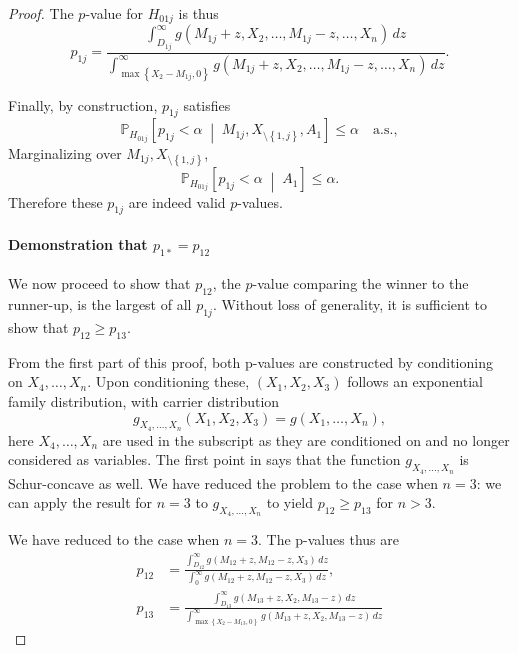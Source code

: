 \documentclass[11pt]{article}
\theoremstyle{definition}
\theoremstyle{custom}
\newcommand{\PP}{\mathbb{P}}
\begin{document}
\begin{proof}
The $p$-value for $H_{01j}$ is thus
\begin{equation}
p_{1j} = \frac{\int_{D_{1j}}^\infty g\left(M_{1j} + z, X_2, \ldots, M_{1j} - z, \ldots, X_n\right) \,dz}{\int_{\max\left\{X_2 - M_{1j}, 0\right\}}^\infty g\left(M_{1j} + z, X_2, \ldots, M_{1j} - z, \ldots, X_n\right) \,dz}.
\label{eq:p1j}
\end{equation}

Finally, by construction, $p_{1j}$ satisfies
$$\PP_{H_{01j}}\left[p_{1j} < \alpha \;\middle|\; M_{1j}, X_{\setminus\left\{1, j\right\}}, A_1\right] \le \alpha \quad \text{a.s.},$$
Marginalizing over $M_{1j}, X_{\setminus\left\{1, j\right\}}$,
$$\PP_{H_{01j}}\left[p_{1j} < \alpha \;\middle|\; A_1\right] \le \alpha.$$
Therefore these $p_{1j}$ are indeed valid $p$-values.

\paragraph{Demonstration that $p_{1*}=p_{12}$}

We now proceed to show that $p_{12}$, the $p$-value comparing the winner to the runner-up, is the largest of all $p_{1j}$. Without loss of generality, it is sufficient to show that $p_{12} \ge p_{13}$.

From the first part of this proof, both p-values are constructed by conditioning on $X_4, \ldots, X_n$. Upon conditioning these, $\left(X_1, X_2, X_3\right)$ follows an exponential family distribution, with carrier distribution
$$g_{X_4, \ldots, X_n}\left(X_1, X_2, X_3\right) = g\left(X_1, \ldots, X_n\right),$$
here $X_4, \ldots, X_n$ are used in the subscript as they are conditioned on and no longer considered as variables. The first point in  says that the function $g_{X_4, \ldots, X_n}$ is Schur-concave as well. We have reduced the problem to the case when $n = 3$: we can apply the result for $n = 3$ to $g_{X_4, \ldots, X_n}$ to yield $p_{12} \ge p_{13}$ for $n > 3$.

We have reduced to the case when $n = 3$. The p-values thus are
\begin{align*}
p_{12} & = \frac{\int_{D_{12}}^\infty g\left(M_{12} + z, M_{12} - z, X_3\right) \,dz}{\int_0^\infty g\left(M_{12} + z, M_{12} - z, X_3\right) \,dz}, \\
p_{13} & = \frac{\int_{D_{13}}^\infty g\left(M_{13} + z, X_2, M_{13} - z\right) \,dz}{\int_{\max\left\{X_2 - M_{13}, 0\right\}}^\infty g\left(M_{13} + z, X_2, M_{13} - z\right) \,dz}
\end{align*}


\end{proof}
\end{document}
